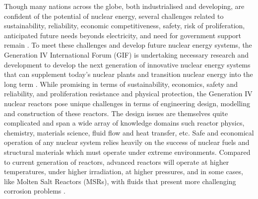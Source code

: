 	Though many nations across the globe, both industrialised and developing, are confident of the potential of nuclear energy, several challenges related to sustainability, reliability, economic competitiveness, safety, risk of proliferation, anticipated future needs beyonds electricity, and need for government support  remain \cite{GIF:2009aa}. To meet these challenges and develop future nuclear energy systems, the Generation {IV} International Forum (GIF) is undertaking necessary research and development to develop the next generation of innovative nuclear energy systems that can supplement today's nuclear plants and transition nuclear energy into the long term \cite{GIF:2019aa}. While promising in terms of sustainability, economics, safety and reliability, and proliferation resistance and physical protection, the Generation {IV} nuclear reactors pose unique challenges in terms of engineering design, modelling and construction of these reactors. The design issues are themselves quite complicated and span a wide array of knowledge domains such reactor physics, chemistry, materials science, fluid flow and heat transfer, etc. Safe and economical operation of any nuclear system relies heavily on the success of nuclear fuels and structural materials which must operate under extreme environments. Compared to current generation of reactors, advanced reactors will operate at higher temperatures, under higher irradiation, at higher pressures, and in some cases, like Molten Salt Reactors (MSRs), with fluids that present more challenging corrosion problems \cite{Allen:2010aa}.

